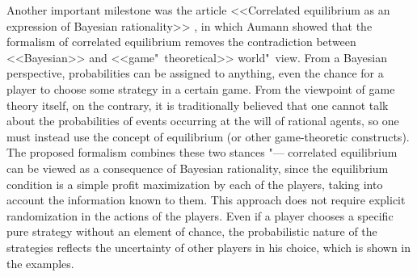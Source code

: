 Another important milestone was the article <<Correlated equilibrium as an expression of Bayesian rationality>> \cite{Aumann87}, in which Aumann showed that the formalism of correlated equilibrium removes the contradiction between <<Bayesian>> and <<game"~theoretical>> world"~view. From a Bayesian perspective, probabilities can be assigned to anything, even the chance for a player to choose some strategy in a certain game. From the viewpoint of game theory itself, on the contrary, it is traditionally believed that one cannot talk about the probabilities of events occurring at the will of rational agents, so one must instead use the concept of equilibrium (or other game-theoretic constructs). The proposed formalism combines these two stances "--- correlated equilibrium can be viewed as a consequence of Bayesian rationality, since the equilibrium condition is a simple profit maximization by each of the players, taking into account the information known to them. This approach does not require explicit randomization in the actions of the players. Even if a player chooses a specific pure strategy without an element of chance, the probabilistic nature of the strategies reflects the uncertainty of other players in his choice, which is shown in the examples. %

